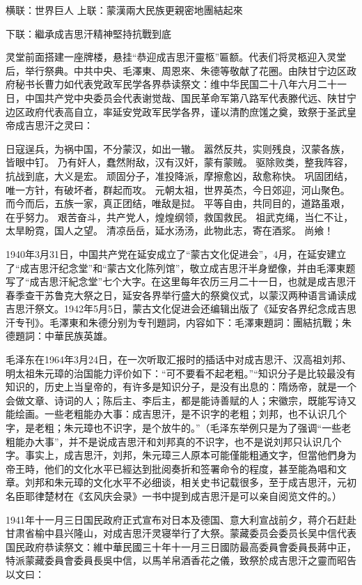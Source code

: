 横联：世界巨人
上联：蒙漢兩大民族更親密地團結起來

下联：繼承成吉思汗精神堅持抗戰到底

灵堂前面搭建一座牌楼，悬挂“恭迎成吉思汗靈柩”匾额。代表们将灵柩迎入灵堂后，举行祭典。中共中央、毛澤東、周恩來、朱德等敬献了花圈。由陕甘宁边区政府秘书长曹力如代表党政军民学各界恭读祭文：维中华民国二十八年六月二十一日，中国共产党中央委员会代表谢觉哉、国民革命军第八路军代表滕代远、陕甘宁边区政府代表高自立，率延安党政军民学各界，谨以清酌庶馐之奠，致祭于圣武皇帝成吉思汗之灵曰：

日寇逞兵，为祸中国，不分蒙汉，如出一辙。
嚣然反共，实则残良，汉蒙各族，皆眼中钉。
乃有奸人，蠢然附敌，汉有汉奸，蒙有蒙贼。
驱除败类，整我阵容，抗战到底，大义是宏。
顽固分子，准投降派，摩擦愈凶，敌愈称快。
巩固团结，唯一方针，有破坏者，群起而攻。
元朝太祖，世界英杰，今日郊迎，河山聚色。
而今而后，五族一家，真正团结，唯敌是挝。
平等自由，共同目的，道路虽艰，在乎努力。
艰苦奋斗，共产党人，煌煌纲领，救国救民。
祖武克绳，当仁不让，太旱盼霓，国人之望。
清凉岳岳，延水汤汤，此物此志，寄在酒浆。
尚飨！

1940年3月31日，中国共产党在延安成立了“蒙古文化促进会”，4月，在延安建立了“成吉思汗纪念堂”和“蒙古文化陈列馆”，敬立成吉思汗半身塑像，并由毛澤東题写了“成吉思汗紀念堂”七个大字。在这里每年农历三月二十一日，也就是成吉思汗春季查干苏鲁克大祭之日，延安各界举行盛大的祭奠仪式，以蒙汉两种语言诵读成吉思汗祭文。1942年5月5日，蒙古文化促进会还编辑出版了《延安各界纪念成吉思汗专刊》。毛澤東和朱德分别为专刊題詞，内容如下：毛澤東題詞：團結抗戰；朱德題詞：中華民族英雄。

毛泽东在1964年3月24日，在一次听取汇报时的插话中对成吉思汗、汉高祖刘邦、明太祖朱元璋的治国能力评价如下：“可不要看不起老粗。”“知识分子是比较最没有知识的，历史上当皇帝的，有许多是知识分子，是没有出息的：隋炀帝，就是一个会做文章、诗词的人；陈后主、李后主，都是能诗善赋的人；宋徽宗，既能写诗又能绘画。一些老粗能办大事：成吉思汗，是不识字的老粗；刘邦，也不认识几个字，是老粗；朱元璋也不识字，是个放牛的。”（毛泽东举例只是为了强调“一些老粗能办大事”，并不是说成吉思汗和刘邦真的不识字，也不是说刘邦只认识几个字。事实上，成吉思汗，刘邦，朱元璋三人原本可能僅能粗通文字，但當他們身为帝王時，他们的文化水平已經达到批阅奏折和签署命令的程度，甚至能為唱和文章。刘邦和朱元璋的文化水平不必细谈，相关史书记载很多，至于成吉思汗，元初名臣耶律楚材在《玄风庆会录》一书中提到成吉思汗是可以亲自阅览文件的。）

1941年十一月三日国民政府正式宣布对日本及德国、意大利宣战前夕，蒋介石赶赴甘肃省榆中县兴隆山，对成吉思汗灵寝举行了大祭。蒙藏委员会委员长吴中信代表国民政府恭读祭文：維中華民國三十年十一月三日國防最高委員會委員長蔣中正，特派蒙藏委員會委員長吳中信，以馬羊帛酒香花之儀，致祭於成吉思汗之靈而昭告以文曰：

